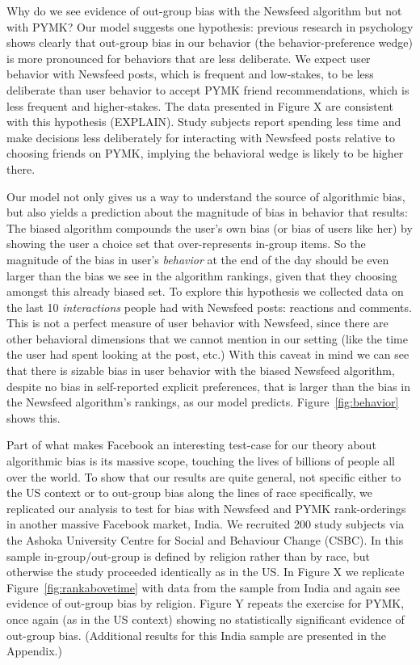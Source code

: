 \documentclass[12pt,letterpaper]{article}
\begin{document}
Why do we see evidence of out-group bias with the Newsfeed algorithm but not with PYMK? Our model suggests one hypothesis: previous research in psychology shows clearly that out-group bias in our behavior (the behavior-preference wedge) is more pronounced for behaviors that are less deliberate. We expect user behavior with Newsfeed posts, which is frequent and low-stakes, to be less deliberate than user behavior to accept PYMK friend recommendations, which is less frequent and higher-stakes. The data presented in Figure X are consistent with this hypothesis (EXPLAIN). Study subjects report spending less time and make decisions less deliberately for interacting with Newsfeed posts relative to choosing friends on PYMK, implying the behavioral wedge is likely to be higher there.

Our model not only gives us a way to understand the source of algorithmic bias, but also yields a prediction about the magnitude of bias in behavior that results: The biased algorithm compounds the user's own bias (or bias of users like her) by showing the user a choice set that over-represents in-group items. So the magnitude of the bias in user's \emph{behavior} at the end of the day should be even larger than the bias we see in the algorithm rankings, given that they choosing amongst this already biased set. To explore this hypothesis we collected data on the last 10 \emph{interactions} people had with Newsfeed posts: reactions and comments. This is not a perfect measure of user behavior with Newsfeed, since there are other behavioral dimensions that we cannot mention in our setting (like the time the user had spent looking at the post, etc.) With this caveat in mind we can see that there is sizable bias in user behavior with the biased Newsfeed algorithm, despite no bias in self-reported explicit preferences, that is larger than the bias in the Newsfeed algorithm's rankings, as our model predicts.  Figure~\ref{fig:behavior} shows this. 
 

Part of what makes Facebook an interesting test-case for our theory about algorithmic bias is its massive scope, touching the lives of billions of people all over the world. To show that our results are quite general, not specific either to the US context or to out-group bias along the lines of race specifically, we replicated our analysis to test for bias with Newsfeed and PYMK rank-orderings in another massive Facebook market, India. We recruited 200 study subjects via the Ashoka University Centre for Social and Behaviour Change (CSBC). In this sample in-group/out-group is defined by religion rather than by race, but otherwise the study proceeded identically as in the US. In Figure X we replicate Figure~\ref{fig:rankabovetime} with data from the sample from India and again see evidence of out-group bias by religion. Figure Y repeats the exercise for PYMK, once again (as in the US context) showing no statistically significant evidence of out-group bias. (Additional results for this India sample are presented in the Appendix.)
\end{document}
